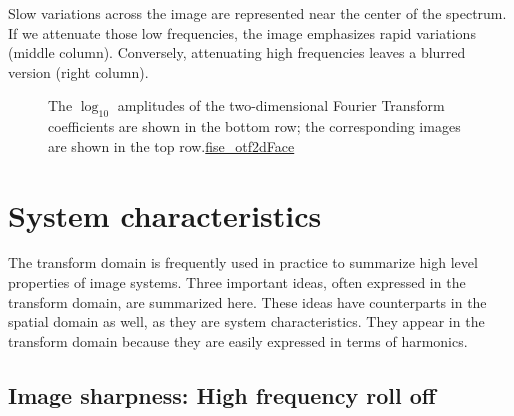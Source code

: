 \documentclass[
  letterpaper,
]{book}
\begin{document}
Slow variations across the image are represented near the center of the
spectrum. If we attenuate those low frequencies, the image emphasizes
rapid variations (middle column). Conversely, attenuating high
frequencies leaves a blurred version (right column).

\begin{figure}


\caption{\label{fig-optics-otf2dparts}The \(\log_{10}\) amplitudes of
the two-dimensional Fourier Transform coefficients are shown in the
bottom row; the corresponding images are shown in the top
row.\href{../code/02Optics/fise_otf2dFace.html}{fise\_otf2dFace}}

\end{figure}%

\section{System characteristics}\label{system-characteristics}

The transform domain is frequently used in practice to summarize high
level properties of image systems. Three important ideas, often
expressed in the transform domain, are summarized here. These ideas have
counterparts in the spatial domain as well, as they are system
characteristics. They appear in the transform domain because they are
easily expressed in terms of harmonics.

\subsection{Image sharpness: High frequency roll
off}\label{image-sharpness-high-frequency-roll-off}
\end{document}
